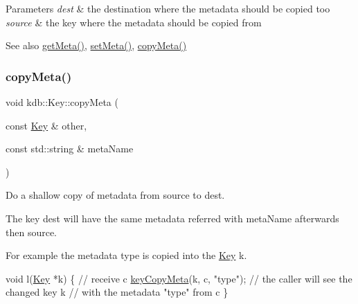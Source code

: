 \begin{DoxyParams}{Parameters}
{\em dest} & the destination where the metadata should be copied too \\
\hline
{\em source} & the key where the metadata should be copied from\\
\hline
\end{DoxyParams}
\begin{DoxySeeAlso}{See also}
\hyperlink{classkdb_1_1Key_acdd4e81b0565756c99826bf926fd6fe4}{get\+Meta()}, \hyperlink{classkdb_1_1Key_a4c5a3d463127ade0b766c4298002daa3}{set\+Meta()}, \hyperlink{classkdb_1_1Key_a53f6d2196a7f17c4bdc544207bdc5f4c}{copy\+Meta()} 
\end{DoxySeeAlso}
\mbox{\label{classkdb_1_1Key_a53f6d2196a7f17c4bdc544207bdc5f4c}} 
\subsubsection{\texorpdfstring{copy\+Meta()}{copyMeta()}}
{\footnotesize\ttfamily void kdb\+::\+Key\+::copy\+Meta (\begin{DoxyParamCaption}\item[{const \hyperlink{classkdb_1_1Key}{Key} \&}]{other,  }\item[{const std\+::string \&}]{meta\+Name }\end{DoxyParamCaption})\hspace{0.3cm}{\ttfamily [inline]}}



Do a shallow copy of metadata from source to dest. 

The key dest will have the same metadata referred with meta\+Name afterwards then source.

For example the metadata type is copied into the \hyperlink{classkdb_1_1Key}{Key} k.


\begin{DoxyCode}
\textcolor{keywordtype}{void} l(\hyperlink{classkdb_1_1Key_a5679f5cae63caddd64a60388b9cc77fa}{Key} *k)
\{
        \textcolor{comment}{// receive c}
        \hyperlink{group__keymeta_ga9a22b992478e613c8788bd460b4a1f0c}{keyCopyMeta}(k, c, \textcolor{stringliteral}{"type"});
        \textcolor{comment}{// the caller will see the changed key k}
        \textcolor{comment}{// with the metadata "type" from c}
\}
\end{DoxyCode}


